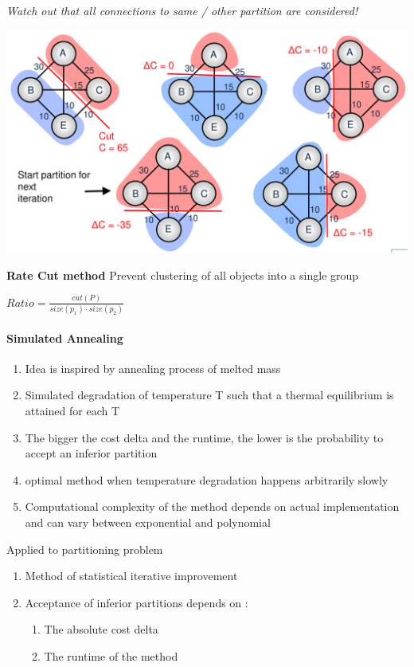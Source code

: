 \documentclass[english]{latex4ei/latex4ei_sheet}
\begin{document}
\textit{Watch out that all connections to same / other partition are considered!}

\begin{center}
  \includegraphics[width=0.8\linewidth]{assets/MinCut.png}
  \label{fig:mincut}
\end{center}

\textbf{Rate Cut method} Prevent clustering of all objects into a single group

$Ratio = \frac{cut(P)}{size(p_1) \cdot size(p_2)}$

\paragraph{Simulated Annealing}
\begin{enumerate}
	\item Idea is inspired by annealing process of melted mass
	\item Simulated degradation of temperature T such that a thermal equilibrium is attained for each T
	\item The bigger the cost delta and the runtime, the lower is the probability to accept an inferior partition
	\item optimal method when temperature degradation happens arbitrarily slowly
	\item Computational complexity of the method depends on actual implementation and can vary between exponential and polynomial
\end{enumerate}


Applied to partitioning problem
\begin{enumerate}
	\item  Method of statistical iterative improvement 
	\item Acceptance of inferior partitions depends on :
	  \begin{enumerate}
	  	\item The absolute cost delta
		\item The runtime of the method
	  \end{enumerate}
\end{enumerate}
\end{document}
